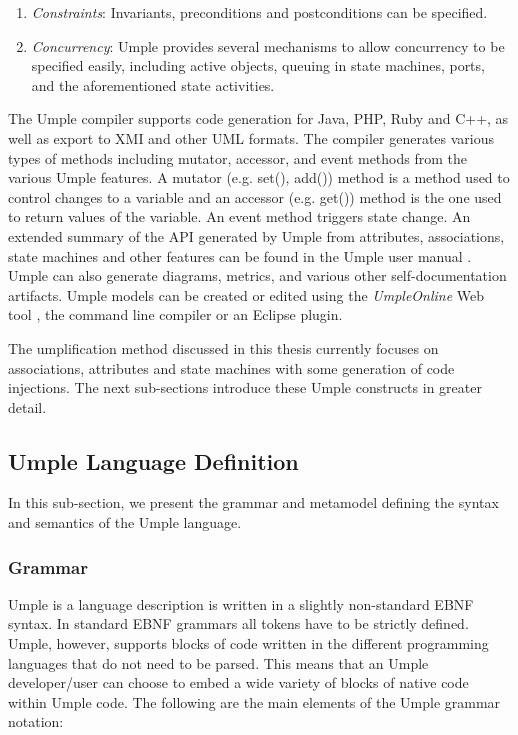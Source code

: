 \begin{enumerate}
 \item 	\textit{Constraints}: Invariants, preconditions and postconditions can be specified.

 \item 	\textit{Concurrency}: Umple provides several mechanisms to allow concurrency to be specified easily, including active objects, queuing in state machines, ports, and the aforementioned state activities.
\end{enumerate}

The Umple compiler supports code generation for Java, PHP, Ruby and C++, as well as export to XMI and other UML formats. The compiler generates various types of methods including mutator, accessor, and event methods from the various Umple features. A mutator (e.g. set(), add()) method is a method used to control changes to a variable and an accessor (e.g. get()) method is the one used to return values of the variable. An event method triggers state change. An extended summary of the API generated by Umple from attributes, associations, state machines and other features can be found in the Umple user manual \cite{UmpleAPI}. Umple can also generate diagrams, metrics, and various other self-documentation artifacts. Umple models can be created or edited using the \textit{UmpleOnline} Web tool \cite{UmpleOnline}, the command line compiler or an Eclipse plugin. 

The umplification method discussed in this thesis currently focuses on associations,  attributes and state machines with some generation of code injections. The next sub-sections introduce these Umple constructs in greater detail.

\subsection{Umple Language Definition}
In this sub-section, we present the grammar and metamodel defining the syntax and semantics of the Umple language. 

\subsubsection{Grammar}

Umple is a language description is written in a slightly non-standard EBNF syntax. In standard EBNF grammars all tokens have to be strictly defined. Umple, however, supports blocks of code written in the different programming languages that do not need to be parsed. This means that an Umple developer/user can choose to embed a wide variety of blocks of native code within Umple code. The following are the main elements of the Umple grammar notation:

